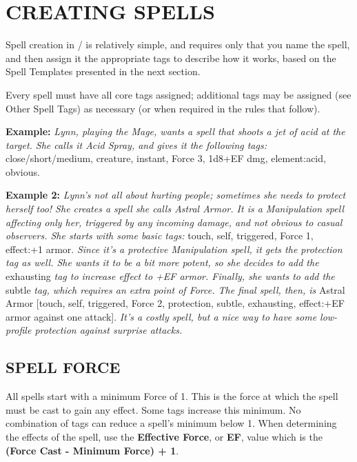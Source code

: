 \documentclass[oneside,10pt]{article}
\begin{document}
\section{CREATING SPELLS}
\begin{multicols}{2}
Spell creation in \SW/ is relatively simple, and requires
only that you name the spell, and then assign it the appropriate tags to describe how it works, based on the Spell Templates presented in the next section.

Every spell must have all core tags assigned; additional tags
may be assigned (see Other Spell Tags) as necessary (or when
required in the rules that follow).

\begin{dent}

\textbf{Example:} \textit{Lynn, playing the Mage, wants a spell that
shoots a jet of acid at the target. She calls it Acid Spray,
and gives it the following tags:} close/short/medium, creature, instant, Force 3, 1d8+EF dmg, element:acid,
obvious.
\end{dent}

\begin{dent}

\textbf{Example 2:} \textit{Lynn’s not all about hurting people; sometimes she needs to protect herself too! She creates a spell
she calls Astral Armor. It is a Manipulation spell affecting
only her, triggered by any incoming damage, and not obvious to casual observers. She starts with some basic tags:}
touch, self, triggered, Force 1, effect:+1 armor. \textit{Since it’s
a protective Manipulation spell, it gets the protection tag
as well. She wants it to be a bit more potent, so she decides to add the} exhausting \textit{tag to increase effect to +EF armor.
Finally, she wants to add the} subtle\textit{ tag, which requires an
extra point of Force. The final spell, then, is} Astral Armor
[touch, self, triggered, Force 2, protection, subtle, exhausting, effect:+EF armor against one attack]. \textit{It’s a costly
spell, but a nice way to have some low-profile protection
against surprise attacks.}
\end{dent}

\subsection{SPELL FORCE}
All spells start with a minimum Force of 1. This is the force at which the spell must be cast to gain any effect. Some tags increase this minimum. No combination of tags can reduce a spell's minimum below 1. When determining the effects of the spell, use the \textbf{Effective Force}, or \textbf{EF}, value which is the \textbf{(Force Cast - Minimum Force) + 1}. 


\end{multicols}
\end{document}
